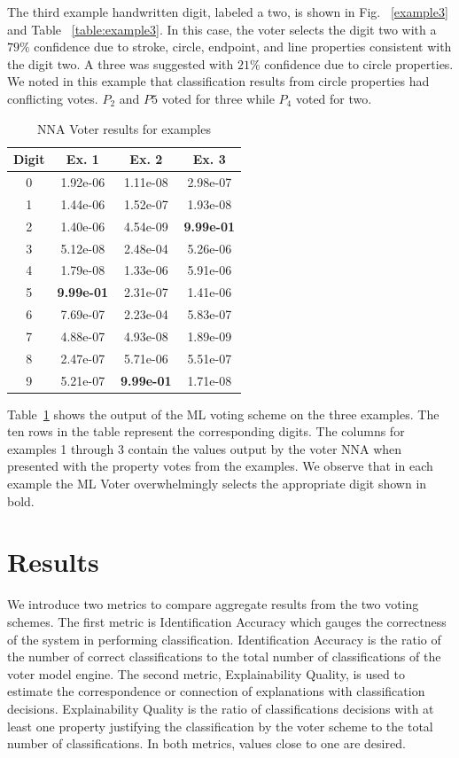 \documentclass[conference]{IEEEtran}
\begin{document}
The third example handwritten digit, labeled a two, is shown in Fig. ~\ref{example3} and Table ~\ref{table:example3}.  In this case,  the voter selects the digit two with a $79\%$ confidence due to stroke, circle, endpoint, and line properties consistent with the digit two.  A three was suggested with $21\%$ confidence due to circle properties.  We noted in this example that classification results from circle properties had conflicting votes.  $P_2$ and $P5$ voted for three while $P_4$ voted for two.

\begin{table}[htbp]
\caption{NNA Voter results for examples}
\centering
\begin{tabular}{| c | c | c | c |}
\hline
 Digit & Ex. 1 & Ex. 2 & Ex. 3 \\
\hline\hline
0 & 1.92e-06 & 1.11e-08 & 2.98e-07\\ 
\hline
1 & 1.44e-06 & 1.52e-07 & 1.93e-08 \\
\hline
2 & 1.40e-06 & 4.54e-09 & \textbf{9.99e-01} \\
\hline
3 & 5.12e-08 & 2.48e-04 & 5.26e-06 \\
\hline
4 & 1.79e-08 & 1.33e-06 & 5.91e-06 \\
\hline
5 & \textbf{9.99e-01} & 2.31e-07 & 1.41e-06 \\
\hline
6 & 7.69e-07 & 2.23e-04 & 5.83e-07 \\
\hline
7 & 4.88e-07 & 4.93e-08 & 1.89e-09 \\
\hline
8 & 2.47e-07 & 5.71e-06 & 5.51e-07 \\
\hline
9 & 5.21e-07 & \textbf{9.99e-01} & 1.71e-08 \\
\hline
\end{tabular}
\label{table:nnavoter}
\end{table}

Table~\ref{table:nnavoter} shows the output of the ML voting scheme on the three examples.  The ten rows in the table represent the corresponding digits.  The columns for examples 1 through 3 contain the values output by the voter NNA when presented with the property votes from the examples.  We observe that in each example the ML Voter overwhelmingly selects the appropriate digit shown in bold.

\section{Results}

We introduce two metrics to compare aggregate results from the two voting schemes.  The first metric is Identification Accuracy which gauges the correctness of the system in performing classification.  Identification Accuracy is the ratio of the number of correct classifications to the total number of classifications of the voter model engine.  The second metric, Explainability Quality, is used to estimate the correspondence or connection of explanations with classification decisions.  Explainability Quality is the ratio of classifications decisions with at least one property justifying the classification by the voter scheme to the total number of classifications.   In both metrics, values close to one are desired.
\end{document}
